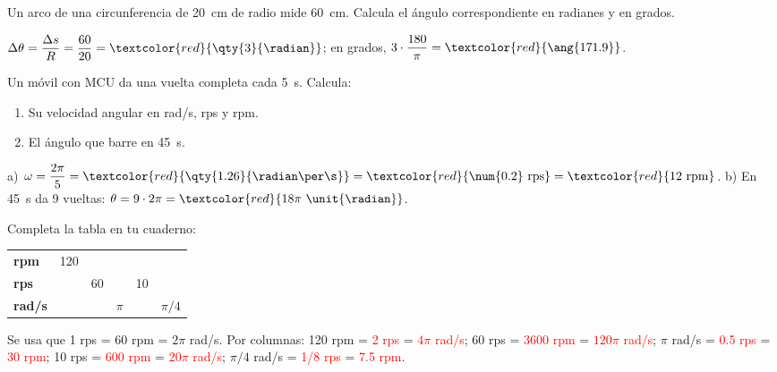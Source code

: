 \begin{exercise}
    Un arco de una circunferencia de \qty{20}{\cm} de radio mide \qty{60}{\cm}. Calcula el ángulo correspondiente en radianes y en grados.
    \begin{solu}
        \(\Delta\theta = \dfrac{\Delta s}{R} = \dfrac{60}{20} = \textcolor{red}{\qty{3}{\radian}}\); en grados, \(3 \cdot \dfrac{180}{\pi} = \textcolor{red}{\ang{171.9}}\).
    \end{solu}
\end{exercise}

\begin{exercise}
    Un móvil con MCU da una vuelta completa cada \qty{5}{\s}. Calcula:
    \begin{enumerate}[label=\alph*)]
        \item Su velocidad angular en rad/s, rps y rpm.
        \item El ángulo que barre en \qty{45}{\s}.
    \end{enumerate}
    \begin{solu}
        a) \(\omega = \dfrac{2\pi}{5} = \textcolor{red}{\qty{1.26}{\radian\per\s}} = \textcolor{red}{\num{0.2}~\text{rps}} = \textcolor{red}{12~\text{rpm}}\). b) En \qty{45}{\s} da 9 vueltas: \(\theta = 9 \cdot 2\pi = \textcolor{red}{18\pi~\unit{\radian}}\).
    \end{solu}
\end{exercise}

\begin{exercise}
    Completa la tabla en tu cuaderno:
    \begin{center}
        \begin{tabular}{@{}lccccc@{}}
            \toprule
            \textbf{rpm} & 120 &  &  &  &  \\[3pt]
            \textbf{rps} &  & 60 &  & 10 &  \\[3pt]
            \textbf{rad/s} &  &  & \(\pi\) &  & \(\pi/4\) \\
            \bottomrule
        \end{tabular}
    \end{center}
    \begin{solu}
        Se usa que 1 rps = 60 rpm = \(2\pi\) rad/s. Por columnas: 120 rpm = \textcolor{red}{2 rps} = \textcolor{red}{\(4\pi\) rad/s}; 60 rps = \textcolor{red}{3600 rpm} = \textcolor{red}{\(120\pi\) rad/s}; \(\pi\) rad/s = \textcolor{red}{\num{0.5} rps} = \textcolor{red}{30 rpm}; 10 rps = \textcolor{red}{600 rpm} = \textcolor{red}{\(20\pi\) rad/s}; \(\pi/4\) rad/s = \textcolor{red}{1/8 rps} = \textcolor{red}{\num{7.5} rpm}.
    \end{solu}
\end{exercise}


